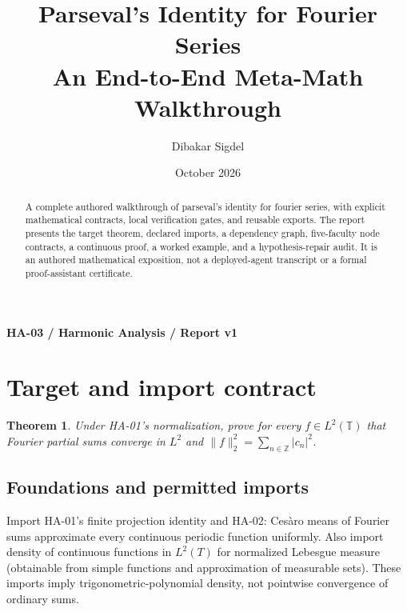 \documentclass[preprint,12pt,aps,pra,showkeys,amsmath,amssymb,superscriptaddress,floatfix]{revtex4-2}
\newtheorem{theorem}{Theorem}[section]
\theoremstyle{definition}
\theoremstyle{remark}
\begin{document}
\title{Parseval's Identity for Fourier Series\\[4pt]\large An End-to-End Meta-Math Walkthrough}

\author{Dibakar Sigdel}


\date{October 2026}

\begin{abstract}

A complete authored walkthrough of parseval's identity for fourier
series, with explicit mathematical contracts, local verification gates,
and reusable exports. The report presents the target theorem, declared
imports, a dependency graph, five-faculty node contracts, a continuous
proof, a worked example, and a hypothesis-repair audit. It is an
authored mathematical exposition, not a deployed-agent transcript or a
formal proof-assistant certificate.

\end{abstract}\maketitle\linespread{1.12}\selectfont

\noindent\textbf{HA-03 / Harmonic Analysis / Report v1}

\section{Target and import contract}

\begin{theorem}

Under HA-01's normalization, prove for every \(f\in L^2(\mathbb T)\)
that Fourier partial sums converge in \(L^2\) and
\(\|f\|_2^2=\sum_{n\in\mathbb Z}|c_n|^2\).

\end{theorem}

\subsection{Foundations and permitted imports}

Import HA-01's finite projection identity and HA-02: Cesàro means of
Fourier sums approximate every continuous periodic function uniformly.
Also import density of continuous functions in \(L^{2}(T)\) for
normalized Lebesgue measure (obtainable from simple functions and
approximation of measurable sets). These imports imply
trigonometric-polynomial density, not pointwise convergence of ordinary
sums.
\end{document}
